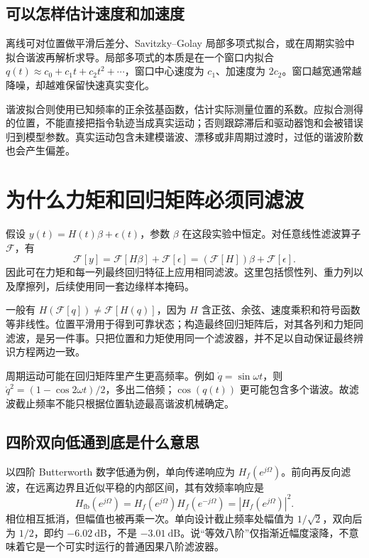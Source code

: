 \subsection{可以怎样估计速度和加速度}
离线可对位置做平滑后差分、Savitzky--Golay 局部多项式拟合，或在周期实验中拟合谐波再解析求导。局部多项式的本质是在一个窗口内拟合 $q(t)\approx c_0+c_1t+c_2t^2+\cdots$，窗口中心速度为 $c_1$、加速度为 $2c_2$。窗口越宽通常越降噪，却越难保留快速真实变化。

谐波拟合则使用已知频率的正余弦基函数，估计实际测量位置的系数。应拟合测得的位置，不能直接把指令轨迹当成真实运动；否则跟踪滞后和驱动器饱和会被错误归到模型参数。真实运动包含未建模谐波、漂移或非周期过渡时，过低的谐波阶数也会产生偏差。

\section{为什么力矩和回归矩阵必须同滤波}
假设 $y(t)=H(t)\beta+\epsilon(t)$，参数 $\beta$ 在这段实验中恒定。对任意线性滤波算子 $\mathcal F$，有
\begin{equation}
 \mathcal F[y]=\mathcal F[H\beta]+\mathcal F[\epsilon]
 =(\mathcal F[H])\beta+\mathcal F[\epsilon].
\end{equation}
因此可在力矩和每一列最终回归特征上应用相同滤波。这里包括惯性列、重力列以及摩擦列，后续使用同一套边缘样本掩码。

\begin{pitfallbox}
一般有 $H(\mathcal F[q])\ne\mathcal F[H(q)]$，因为 $H$ 含正弦、余弦、速度乘积和符号函数等非线性。位置平滑用于得到可靠状态；构造最终回归矩阵后，对其各列和力矩同滤波，是另一件事。只把位置和力矩使用同一个滤波器，并不足以自动保证最终辨识方程两边一致。
\end{pitfallbox}

周期运动可能在回归矩阵里产生更高频率。例如 $\dot q=\sin\omega t$，则 $\dot q^2=(1-\cos2\omega t)/2$，多出二倍频；$\cos(q(t))$ 更可能包含多个谐波。故滤波截止频率不能只根据位置轨迹最高谐波机械确定。

\subsection{四阶双向低通到底是什么意思}
以四阶 Butterworth 数字低通为例，单向传递响应为 $H_f(e^{j\Omega})$。前向再反向滤波，在远离边界且近似平稳的内部区间，其有效频率响应是
\[
 H_{\mathrm{fb}}(e^{j\Omega})=H_f(e^{j\Omega})H_f(e^{-j\Omega})=|H_f(e^{j\Omega})|^2.
\]
相位相互抵消，但幅值也被再乘一次。单向设计截止频率处幅值为 $1/\sqrt2$，双向后为 $1/2$，即约 $-6.02\ \mathrm{dB}$，不是 $-3.01\ \mathrm{dB}$。说“等效八阶”仅指渐近幅度滚降，不意味着它是一个可实时运行的普通因果八阶滤波器。

